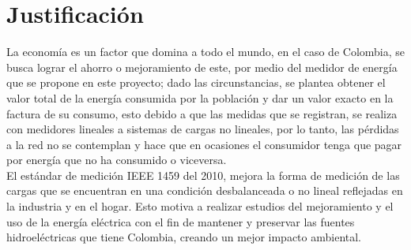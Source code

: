 


\newpage{\clearpage}
\chapter{ Justificación}

La economía es un factor que domina a todo el mundo, en el caso de Colombia, se busca lograr el ahorro o mejoramiento de este, por medio del medidor de energía que se propone en este proyecto; dado las circunstancias, se plantea obtener el valor total de la energía consumida por la población y dar un valor exacto en la factura de su consumo, esto debido a que las medidas que se registran, se realiza con medidores lineales a sistemas de cargas no lineales, por lo tanto, las pérdidas a la red no se contemplan y hace que en ocasiones el consumidor tenga que pagar por energía que no ha consumido o viceversa.\\

El estándar de medición IEEE 1459 del 2010, mejora la forma de medición de las cargas que se encuentran en una condición desbalanceada o no lineal reflejadas en la industria y en el hogar. Esto motiva a realizar estudios del mejoramiento y el uso de la energía eléctrica con el fin de mantener y preservar las fuentes hidroeléctricas que tiene Colombia, creando un mejor impacto ambiental.\\

